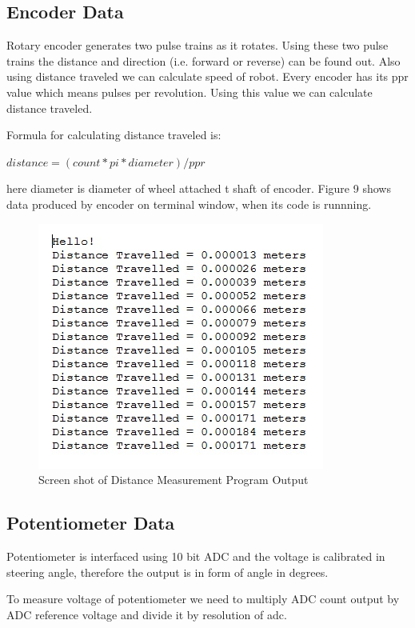 \documentclass[conference]{IEEEtran}
\begin{document}
\subsection{Encoder Data}
Rotary encoder generates two pulse trains as it rotates. Using these two pulse trains the distance and direction (i.e. forward or reverse) can be found out. Also using distance traveled we can calculate speed of robot. Every encoder has its ppr value which means pulses per revolution. Using this value we can calculate distance traveled.

Formula for calculating distance traveled is: 

$ distance = (count * pi * diameter) / ppr $

here diameter is diameter of wheel attached t shaft of encoder. Figure 9 shows data produced by encoder on terminal window, when its code is runnning.

\begin{figure}[H]
\centering
\includegraphics[width=0.9\linewidth]{enc}
\caption{Screen shot of Distance Measurement Program Output}
\end{figure}


\subsection{Potentiometer Data}
Potentiometer is interfaced using 10 bit ADC and the voltage is calibrated in steering angle, therefore the output is in form of angle in degrees.

To measure voltage of potentiometer we need to multiply ADC count output by ADC reference voltage and divide it by resolution of adc.
\end{document}
